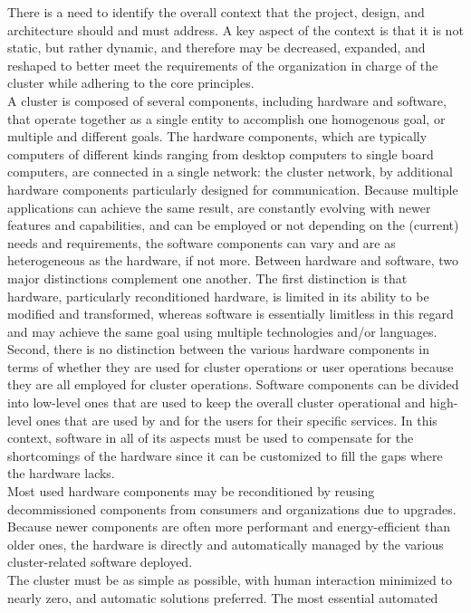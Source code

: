 There is a need to identify the overall context that the project, design, and
architecture should and must address. A key aspect of the context is that it is not
static, but rather dynamic, and therefore may be decreased, expanded, and reshaped
to better meet the requirements of the organization in charge of the cluster while
adhering to the core principles. \\ %
A cluster is composed of several components, including hardware and software, that
operate together as a single entity to accomplish one homogenous goal, or
multiple and different goals. The hardware components, which are typically
computers of different kinds ranging from desktop computers to single board
computers, are connected in a single network: the cluster network, by additional
hardware components particularly designed for communication. Because multiple
applications can achieve the same result, are constantly evolving with newer features
and capabilities, and can be employed or not depending on the (current) needs
and requirements, the software components can vary and are as heterogeneous as the
hardware, if not more. Between hardware and software, two major distinctions
complement one another. The first distinction is that hardware, particularly
reconditioned hardware, is limited in its ability to be modified and transformed,
whereas software is essentially limitless in this regard and may achieve the
same goal using multiple technologies and/or languages. Second, there is no
distinction between the various hardware components in terms of whether they are
used for cluster operations or user operations because they are all employed for
cluster operations. Software components can be divided into low-level ones that are
used to keep the overall cluster operational and high-level ones that are used by
and for the users for their specific services. In this context, software in all of
its aspects must be used to compensate for the shortcomings of the hardware since
it can be customized to fill the gaps where the hardware lacks. \\ %
Most used hardware components may be reconditioned by reusing decommissioned components
from consumers and organizations due to upgrades. Because newer components are
often more performant and energy-efficient than older ones, the hardware is directly
and automatically managed by the various cluster-related software deployed. \\ %
The cluster must be as simple as possible, with human interaction minimized to
nearly zero, and automatic solutions preferred. The most essential automated
